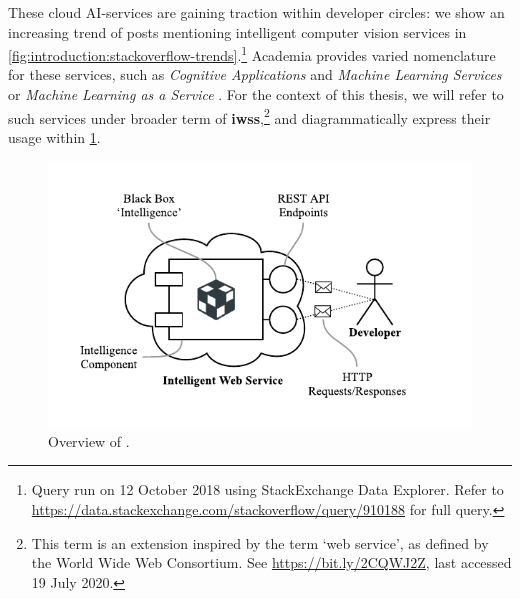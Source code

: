 These cloud AI-services are gaining traction within developer circles: we show an increasing trend of  posts mentioning intelligent computer vision services in \cref{fig:introduction:stackoverflow-trends}.\footnote{Query run on 12 October 2018 using StackExchange Data Explorer. Refer to \url{https://data.stackexchange.com/stackoverflow/query/910188} for full query.}
Academia provides varied nomenclature for these services, such as \textit{Cognitive Applications} and \textit{Machine Learning Services} \citep{Hwang:2017tr} or \textit{Machine Learning as a Service} \citep{Ribeiro:2015dz}. 
For the context of this thesis, we will refer to such services under broader term of \textbf{\glspl{iws}},\footnote{This term is an extension inspired by the term `web service', as defined by the World Wide Web Consortium. See \url{https://bit.ly/2CQWJ2Z}, last accessed 19 July 2020.} and diagrammatically express their usage within \cref{fig:introduction:cloud-intelliegnce-service}.

\begin{figure}[h!]
\centering
\includegraphics[width=0.9\linewidth]{cloud-intelliegnce-service}
\caption[Overview of intelligent web services]{Overview of .}
\label{fig:introduction:cloud-intelliegnce-service}
\end{figure}

